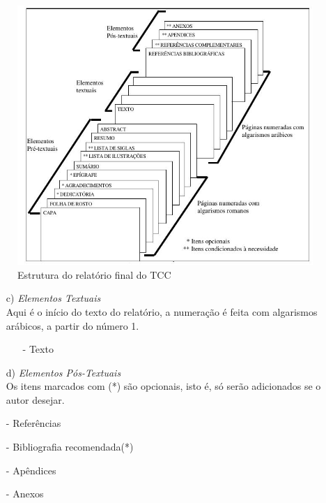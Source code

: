\documentclass[pnumromarab, normaltoc, a4paper, 12pt]{abnt-unochapeco}
\begin{document}
\newpage

\begin{figure}[!h]
  \begin{center}
  \caption{Estrutura do relatório final do TCC}
  \includegraphics[width=160mm]{images/imagem2.jpeg}
  \end{center}
\end{figure}

\begin{itemize}
  \leading{5mm}
  \item [c)] \emph{Elementos Textuais} \\
  Aqui é o início do texto do relatório, a numeração é feita com algarismos
  arábicos, a partir do número 1.

  \begin{itemize}
    \item [-] Texto
  \end{itemize}

  \item [d)] \emph{Elementos Pós-Textuais} \\
  Os itens marcados com (*) são opcionais, isto é, só serão adicionados se o
  autor desejar.
  \item [-] Referências
  \item [-] Bibliografia recomendada(*)
  \item [-] Apêndices
  \item [-] Anexos
\end{itemize}
\end{document}
